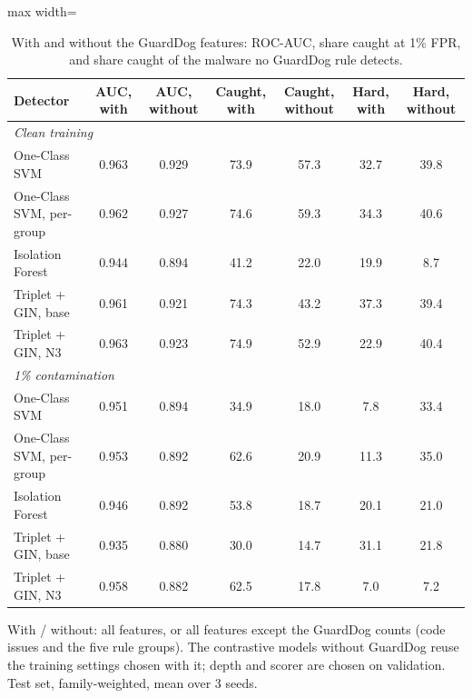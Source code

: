 \begin{table}[htbp]
\centering
\footnotesize
\caption{With and without the GuardDog features: ROC-AUC, share caught at 1\% FPR, and share caught of the malware no GuardDog rule detects.}
\label{tab:nogd}
\begin{adjustbox}{max width=\linewidth}
\begin{tabular}{lcccccc}
\toprule
Detector & AUC, with & AUC, without & Caught, with & Caught, without & Hard, with & Hard, without \\
\midrule
\multicolumn{7}{l}{\textit{Clean training}} \\
One-Class SVM & 0.963 & 0.929 & 73.9 & 57.3 & 32.7 & 39.8 \\
One-Class SVM, per-group & 0.962 & 0.927 & 74.6 & 59.3 & 34.3 & 40.6 \\
Isolation Forest & 0.944 & 0.894 & 41.2 & 22.0 & 19.9 & 8.7 \\
Triplet + GIN, base & 0.961 & 0.921 & 74.3 & 43.2 & 37.3 & 39.4 \\
Triplet + GIN, N3 & 0.963 & 0.923 & 74.9 & 52.9 & 22.9 & 40.4 \\
\midrule
\multicolumn{7}{l}{\textit{1\% contamination}} \\
One-Class SVM & 0.951 & 0.894 & 34.9 & 18.0 & 7.8 & 33.4 \\
One-Class SVM, per-group & 0.953 & 0.892 & 62.6 & 20.9 & 11.3 & 35.0 \\
Isolation Forest & 0.946 & 0.892 & 53.8 & 18.7 & 20.1 & 21.0 \\
Triplet + GIN, base & 0.935 & 0.880 & 30.0 & 14.7 & 31.1 & 21.8 \\
Triplet + GIN, N3 & 0.958 & 0.882 & 62.5 & 17.8 & 7.0 & 7.2 \\
\bottomrule
\end{tabular}
\end{adjustbox}
\par\smallskip
\parbox{0.95\linewidth}{\footnotesize With / without: all features, or all features except the GuardDog counts (code issues and the five rule groups). The contrastive models without GuardDog reuse the training settings chosen with it; depth and scorer are chosen on validation. Test set, family-weighted, mean over 3 seeds.}
\end{table}
